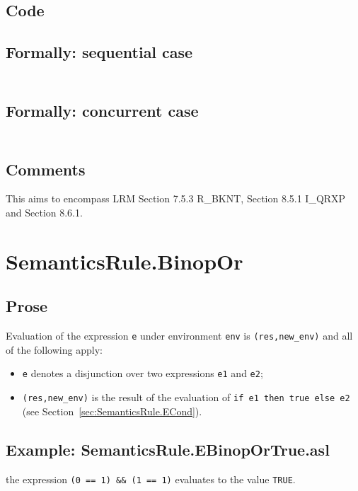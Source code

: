 \documentclass{book}
\begin{document}
  \subsection{Code}

  \subsection{Formally: sequential case}
  \begin{align}
  \end{align} 

  \subsection{Formally: concurrent case}
  \begin{align}
  \end{align} 

  \subsection{Comments}
  This aims to encompass LRM Section 7.5.3 R\_BKNT, Section 8.5.1 I\_QRXP and Section
  8.6.1.

\section{SemanticsRule.BinopOr \label{sec:SemanticsRule.BinopOr}}
  \subsection{Prose}
  Evaluation of the expression \texttt{e} under environment \texttt{env} is
  \texttt{(res,new\_env)} and all of the following apply:
  \begin{itemize}
  \item \texttt{e} denotes a disjunction over two expressions \texttt{e1} and \texttt{e2};
  \item \texttt{(res,new\_env)} is the result of the evaluation of \texttt{if 
e1 then true else e2} (see Section~\ref{sec:SemanticsRule.ECond}).
  \end{itemize}

  \subsection{Example: SemanticsRule.EBinopOrTrue.asl}
    the expression \texttt{(0 == 1) \textbar\textbar \&\& (1 == 1)} evaluates to the value \texttt{TRUE}.
\end{document}
